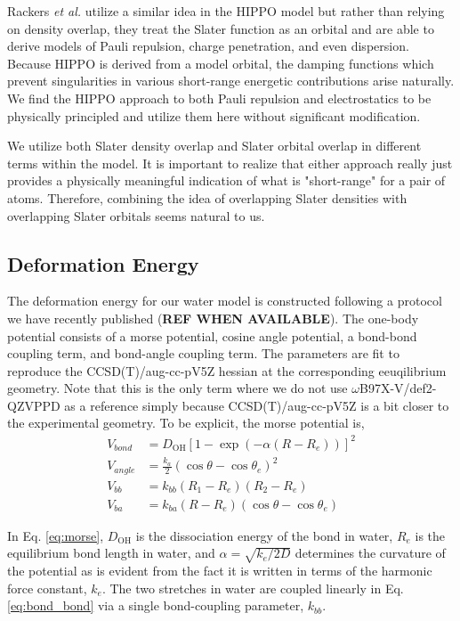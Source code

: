 \documentclass[journal=jacsat,manuscript=article]{achemso}
\begin{document}
Rackers \textit{et al.} utilize a similar idea in the HIPPO model\cite{rackers2021polarizable}
but rather than relying on density overlap, they treat the Slater function as an
orbital and are able to derive models of Pauli repulsion, charge penetration, and
even dispersion. Because HIPPO is derived from a model orbital, the damping functions
which prevent singularities in various short-range energetic contributions arise naturally.
We find the HIPPO approach to both Pauli repulsion and electrostatics to be physically principled
and utilize them here without significant modification.

We utilize both Slater density overlap and Slater orbital overlap in different terms within
the model. It is important to realize that either approach really just provides a
physically meaningful indication of what is "short-range" for a pair of atoms. Therefore,
combining the idea of overlapping Slater densities with overlapping Slater orbitals seems
natural to us.

\subsection*{Deformation Energy}

The deformation energy for our water model is constructed following a protocol we have
recently published (\textbf{REF WHEN AVAILABLE}). The one-body potential consists of a
morse potential, cosine angle potential, a bond-bond coupling term, and bond-angle coupling
term. The parameters are fit to reproduce the CCSD(T)/aug-cc-pV5Z hessian at the
corresponding eeuqilibrium geometry. Note that this is the only term where we do not
use $\omega$B97X-V/def2-QZVPPD as a reference simply because CCSD(T)/aug-cc-pV5Z is a
bit closer to the experimental geometry. To be explicit, the morse potential is,
\begin{align}
  \label{eq:morse}
  V_{bond}&=D_{\mathrm{OH}}\left[ 1-\exp(-\alpha (R-R_e))\right]^2 \\
  \label{eq:angle}
  V_{angle}&=\frac{k_a}{2}(\cos\theta-\cos\theta_e)^2 \\
  \label{eq:bond_bond}
  V_{bb}&=k_{bb}(R_1-R_e)(R_2-R_e) \\
  \label{eq:bond_angle}
  V_{ba}&=k_{ba}(R-R_e)(\cos\theta-\cos\theta_e)
\end{align}

In Eq. \ref{eq:morse}, $D_{\mathrm{OH}}$ is the dissociation energy of
the  bond in water, $R_e$ is the equilibrium bond length in water,
and $\alpha=\sqrt{k_e/2D}$ determines the curvature of the potential as is
evident from the fact it is written in terms of the harmonic force constant, $k_e$.
The two  stretches in water are coupled linearly in Eq. \ref{eq:bond_bond}
via a single bond-coupling parameter, $k_{bb}$.
\end{document}
